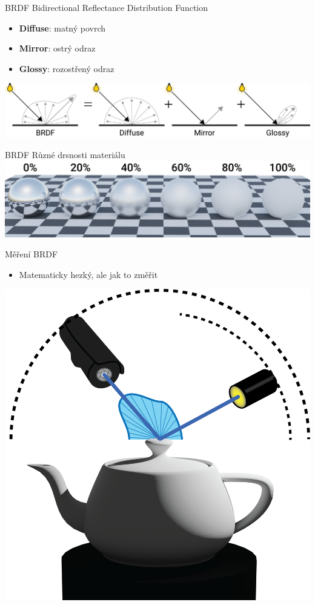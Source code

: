 \documentclass[czech]{beamer}
\begin{document}
\begin{frame}{BRDF}
Bidirectional Reflectance Distribution Function
\begin{itemize}
  \item \textbf{Diffuse}: matný povrch
  \item \textbf{Mirror}: ostrý odraz
  \item \textbf{Glossy}: rozostřený odraz
\end{itemize}
\vfill
\centering \includegraphics[width=1.0\textwidth]{img/brdf.png}
\end{frame}


\begin{frame}{BRDF}
Různé drsnosti materiálu
\vfill
\centering \includegraphics[width=1\textwidth]{img/roughness.png}
\end{frame}


\begin{frame}{Měření BRDF}
\begin{itemize}
  \item Matematicky hezký, ale jak to změřit
\end{itemize}
\vfill
\centering \includegraphics[width=.6\textwidth]{img/measuring brdf.png}
\end{frame}
\end{document}
